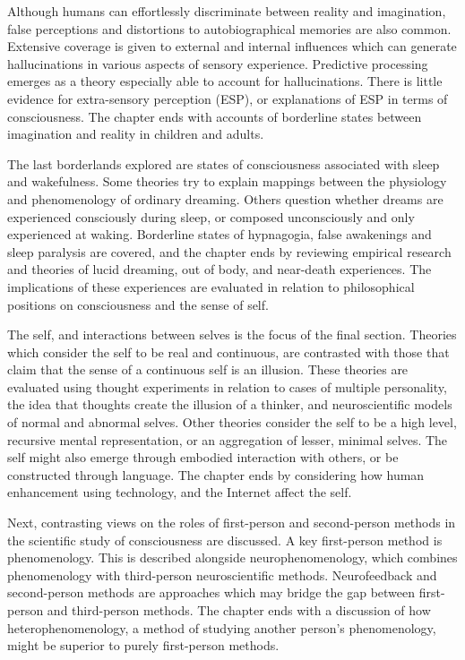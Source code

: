 \documentclass[a4paper]{article}
\begin{document}
Although humans can effortlessly discriminate between reality and imagination,
false perceptions and distortions to autobiographical memories are also
common. Extensive coverage is given to external and internal influences which
can generate hallucinations in various aspects of sensory experience.
Predictive processing emerges as a theory especially able to account for
hallucinations. There is little evidence for extra-sensory perception (ESP),
or explanations of ESP in terms of consciousness. The chapter ends with
accounts of borderline states between imagination and reality in children and
adults.

The last borderlands explored are states of consciousness associated with
sleep and wakefulness. Some theories try to explain mappings between the
physiology and phenomenology of ordinary dreaming. Others question whether
dreams are experienced consciously during sleep, or composed unconsciously and
only experienced at waking. Borderline states of hypnagogia, false awakenings
and sleep paralysis are covered, and the chapter ends by reviewing empirical
research and theories of lucid dreaming, out of body, and near-death
experiences. The implications of these experiences are evaluated in relation
to philosophical positions on consciousness and the sense of self.

The self, and interactions between selves is the focus of the final section.
Theories which consider the self to be real and continuous, are contrasted
with those that claim that the sense of a continuous self is an illusion.
These theories are evaluated using thought experiments in relation to cases of
multiple personality, the idea that thoughts create the illusion of a thinker,
and neuroscientific models of normal and abnormal selves. Other theories
consider the self to be a high level, recursive mental representation, or an
aggregation of lesser, minimal selves. The self might also emerge through
embodied interaction with others, or be constructed through language. The
chapter ends by considering how human enhancement using technology, and the
Internet affect the self.

Next, contrasting views on the roles of first-person and second-person methods
in the scientific study of consciousness are discussed. A key first-person
method is phenomenology. This is described alongside neurophenomenology, which
combines phenomenology with third-person neuroscientific methods.
Neurofeedback and second-person methods are approaches which may bridge the
gap between first-person and third-person methods. The chapter ends with a
discussion of how heterophenomenology, a method of studying another person’s
phenomenology, might be superior to purely first-person methods.
\end{document}
